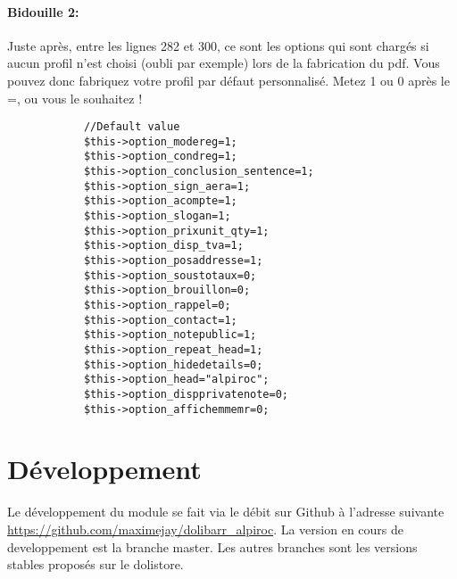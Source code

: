 \documentclass[a4paper,11pt]{article}
\begin{document}
\paragraph{Bidouille 2:\\}

Juste après, entre les lignes 282 et 300, ce sont les options qui sont chargés si aucun profil n'est choisi (oubli par exemple) lors de la fabrication du pdf. Vous pouvez donc fabriquez votre profil par défaut personnalisé. Metez 1 ou 0 après le =, ou vous le souhaitez !

\begin{verbatim}
  			//Default value
			$this->option_modereg=1;
			$this->option_condreg=1;
			$this->option_conclusion_sentence=1;
			$this->option_sign_aera=1;
			$this->option_acompte=1;
			$this->option_slogan=1;
			$this->option_prixunit_qty=1;
			$this->option_disp_tva=1;
			$this->option_posaddresse=1;
			$this->option_soustotaux=0;
			$this->option_brouillon=0;
			$this->option_rappel=0;
			$this->option_contact=1;
			$this->option_notepublic=1;
			$this->option_repeat_head=1;
			$this->option_hidedetails=0;
			$this->option_head="alpiroc";
			$this->option_dispprivatenote=0;
			$this->option_affichemmemr=0;
\end{verbatim}


\section{Développement}
Le développement du module se fait via le débit sur Github à l'adresse suivante \url{https://github.com/maximejay/dolibarr\_alpiroc}.
La version en cours de developpement est la branche master. Les autres branches sont les versions stables proposés sur le dolistore.



\end{document}
